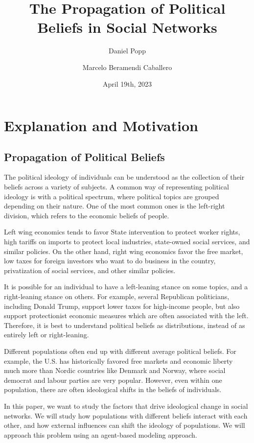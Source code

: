 \documentclass[11pt]{article}
\title{The Propagation of Political Beliefs in Social Networks}
\author{Daniel Popp \and Marcelo Beramendi Caballero}
\date{April 19th, 2023}
\begin{document}
\maketitle

\section{Explanation and Motivation}

\subsection{Propagation of Political Beliefs}

The political ideology of individuals can be understood as the collection of their beliefs across a variety of subjects. A common way of representing political ideology is with a political spectrum, where political topics are grouped depending on their nature. One of the most common ones is the left-right division, which refers to the economic beliefs of people. 

Left wing economics tends to favor State intervention to protect worker rights, high tariffs on imports to protect local industries, state-owned social services, and similar policies. On the other hand, right wing economics favor the free market, low taxes for foreign investors who want to do business in the country, privatization of social services, and other similar policies.

It is possible for an individual to have a left-leaning stance on some topics, and a right-leaning stance on others. For example, several Republican politicians, including Donald Trump, support lower taxes for high-income people, but also support protectionist economic measures which are often associated with the left. Therefore, it is best to understand political beliefs as distributions, instead of as entirely left or right-leaning.

Different populations often end up with different average political beliefs. For example, the U.S. has historically favored free markets and economic liberty much more than Nordic countries like Denmark and Norway, where social democrat and labour parties are very popular. However, even within one population, there are often ideological shifts in the beliefs of individuals.

In this paper, we want to study the factors that drive ideological change in social networks. We will study how populations with different beliefs interact with each other, and how external influences can shift the ideology of populations. We will approach this problem using an agent-based modeling approach.
\end{document}
